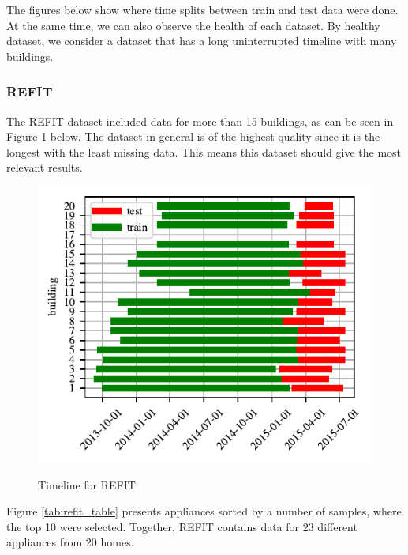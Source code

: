 The figures below show where time splits between train and test data were done.
At the same time, we can also observe the health of each dataset.
By healthy dataset, we consider a dataset that has a long uninterrupted timeline with many buildings.

\subsubsection{REFIT}
The REFIT \cite{REFIT} dataset included data for more than 15 buildings, as can be seen in Figure \ref{fig:refit_timeline} below.
The dataset in general is of the highest quality since it is the longest with the least missing data.
This means this dataset should give the most relevant results.
\begin{figure}[H]
	\centering
	\caption{Timeline for REFIT}
	\includegraphics[]{Figures/EC/refit_timeline.pdf}
	\label{fig:refit_timeline}
\end{figure}

Figure \ref{tab:refit_table} presents appliances sorted by a number of samples, where the top 10 were selected.
Together, REFIT contains data for 23 different appliances from 20 homes.

